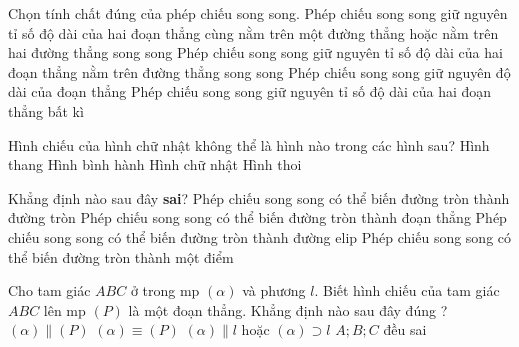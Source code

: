 \begin{ex}%
	Chọn tính chất đúng của phép chiếu  song song.
	\choice 
		{\True Phép chiếu song song giữ nguyên tỉ số độ dài của hai đoạn thẳng cùng nằm  trên một đường thẳng hoặc nằm trên hai đường thẳng song song}
		{Phép chiếu song song giữ nguyên tỉ số độ dài của hai đoạn thẳng  nằm trên đường thẳng song song}
		{Phép chiếu song song giữ nguyên độ dài của  đoạn thẳng}
		{Phép chiếu song song giữ nguyên tỉ  số độ dài của hai đoạn thẳng bất kì}
\end{ex}

\begin{ex}%
	Hình chiếu của hình  chữ nhật không thể là hình nào trong các hình sau?
	\choice 
		{\True Hình thang} 
		 {Hình bình hành}
		 {Hình chữ nhật}
		{Hình  thoi}
\end{ex}

\begin{ex}%
	 Khẳng định nào sau đây \textbf{sai}?
	 \choice
		{Phép chiếu song song có thể  biến đường tròn thành đường tròn}
		{Phép chiếu song song có thể biến đường tròn thành đoạn  thẳng}
		{Phép chiếu song song có thể biến đường tròn thành đường  elip}
		{\True Phép chiếu song song có thể biến đường tròn thành một  điểm}
\end{ex}

\begin{ex}%
	Cho tam giác $ABC$  ở trong mp $(\alpha)$ và phương $l$. Biết hình chiếu của tam giác $ABC$ lên mp $(P)$ là một đoạn thẳng. Khẳng định nào sau đây đúng ?
	\choice 
		{$(\alpha)\parallel (P)$} 
		 {$(\alpha)\equiv (P)$}
		{\True  $(\alpha)\parallel l$ hoặc $(\alpha)\supset l$}
		 {$A;B;C$ đều sai}
\end{ex}

